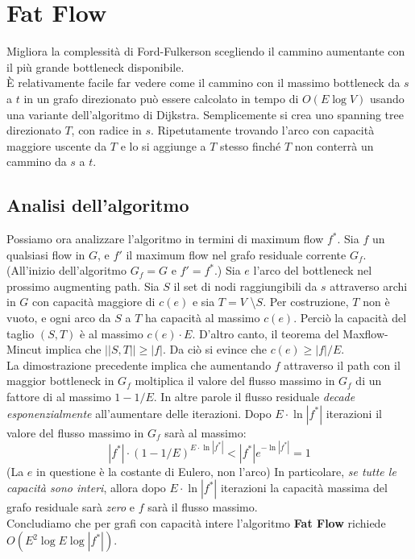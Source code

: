 \section{Fat Flow}
Migliora la complessità di Ford-Fulkerson scegliendo il cammino aumentante con
il più grande bottleneck disponibile.\\

È relativamente facile far vedere come il cammino con il massimo bottleneck da
$s$ a $t$ in un grafo direzionato può essere calcolato in tempo di $O(E\log{V})$
usando una variante dell'algoritmo di Dijkstra. Semplicemente si crea uno
spanning tree direzionato $T$, con radice in $s$. Ripetutamente trovando l'arco
con capacità maggiore uscente da $T$ e lo si aggiunge a $T$ stesso finché $T$
non conterrà un cammino da $s$ a $t$.

\subsection{Analisi dell'algoritmo}

Possiamo ora analizzare l'algoritmo in termini di maximum flow $f^{*}$. Sia $f$
un qualsiasi flow in $G$, e $f'$ il maximum flow nel grafo residuale corrente
$G_f$. (All'inizio dell'algoritmo $G_f = G$ e $f' = f^{*}$.) Sia $e$ l'arco del
bottleneck nel prossimo augmenting path. Sia $S$ il set di nodi raggiungibili da
$s$ attraverso archi in $G$ con capacità maggiore di $c(e)$ e sia $T = V$
\textbackslash $S$. Per costruzione, $T$ non è vuoto, e ogni arco da $S$ a $T$
ha capacità al massimo $c(e)$. Perciò la capacità del taglio $(S,T)$ è al
massimo $c(e) \cdot E$. D'altro canto, il teorema del Maxflow-Mincut implica che
$||S,T|| \geq |f|$. Da ciò si evince che $c(e) \geq |f|/E$.\\

La dimostrazione precedente implica che aumentando $f$ attraverso il path con il
maggior bottleneck in $G_f$ moltiplica il valore del flusso massimo in $G_f$ di
un fattore di al massimo $1 - 1/E$. In altre parole il flusso residuale
\textit{decade esponenzialmente} all'aumentare delle iterazioni. Dopo $E \cdot
  \ln{|f^{*}|}$ iterazioni il valore del flusso massimo in $G_f$ sarà al massimo:
$$
  |f^{*}|\cdot(1-1/E)^{E\cdot \ln{|f^{*}|}} < |f^{*}|e^{-\ln{|f^{*}|}} = 1
$$
(La $e$ in questione è la costante di Eulero, non l'arco) In particolare,
\textit{se tutte le capacità sono interi}, allora dopo $E\cdot \ln{|f^{*}|}$
iterazioni la capacità massima del grafo residuale sarà \textit{zero} e $f$ sarà
il flusso massimo.\\

Concludiamo che per grafi con capacità intere l'algoritmo \textbf{Fat Flow}
richiede $O(E^2\log{E}\log{|f^{*}|})$.